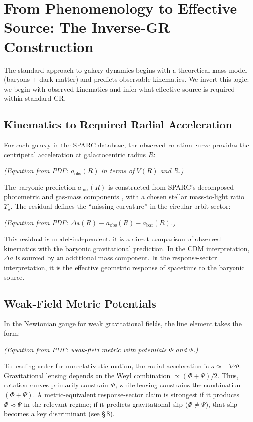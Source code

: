 \section{From Phenomenology to Effective Source: The Inverse-GR Construction}


The standard approach to galaxy dynamics begins with a theoretical mass model (baryons + dark matter) and predicts observable kinematics. We invert this logic: we begin with observed kinematics and infer what effective source is required within standard GR.

\subsection{Kinematics to Required Radial Acceleration}
For each galaxy in the SPARC database, the observed rotation curve provides the centripetal acceleration at galactocentric radius $R$:

\emph{(Equation from PDF: $a_{\mathrm{obs}}(R)$ in terms of $V(R)$ and $R$.)}

The baryonic prediction $a_{\mathrm{bar}}(R)$ is constructed from SPARC's decomposed photometric and gas-mass components \citep{Lelli2016SPARC}, with a chosen stellar mass-to-light ratio $\Upsilon_\star$. The residual defines the ``missing curvature'' in the circular-orbit sector:

\emph{(Equation from PDF: $\Delta a(R) \equiv a_{\mathrm{obs}}(R) - a_{\mathrm{bar}}(R)$.)}

This residual is model-independent: it is a direct comparison of observed kinematics with the baryonic gravitational prediction. In the CDM interpretation, $\Delta a$ is sourced by an additional mass component. In the response-sector interpretation, it is the effective geometric response of spacetime to the baryonic source.

\subsection{Weak-Field Metric Potentials}
In the Newtonian gauge for weak gravitational fields, the line element takes the form:

\emph{(Equation from PDF: weak-field metric with potentials $\Phi$ and $\Psi$.)}

To leading order for nonrelativistic motion, the radial acceleration is $a \approx -\nabla \Phi$. Gravitational lensing depends on the Weyl combination $\propto (\Phi + \Psi)/2$. Thus, rotation curves primarily constrain $\Phi$, while lensing constrains the combination $(\Phi + \Psi)$. A metric-equivalent response-sector claim is strongest if it produces $\Phi \approx \Psi$ in the relevant regime; if it predicts gravitational slip ($\Phi \neq \Psi$), that slip becomes a key discriminant (see \S\,8).

